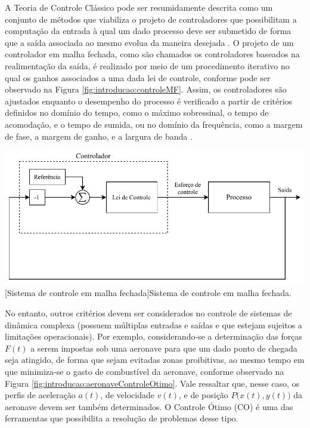 
A Teoria de Controle Clássico pode ser resumidamente descrita como um conjunto de métodos que viabiliza o projeto de controladores que possibilitam a computação da entrada à qual um dado processo deve ser submetido de forma que a saída associada ao mesmo evolua da maneira desejada \cite{franklin_sistemas_2013}. O projeto de um controlador em malha fechada, como são chamados os controladores baseados na realimentação da saída, é realizado por meio de um procedimento iterativo no qual os ganhos associados a uma dada lei de controle, conforme pode ser observado na Figura \ref{fig:introducao:controleMF}. Assim, os controladores são ajustados enquanto o desempenho do processo é verificado a partir de critérios definidos no domínio do tempo, como o máximo sobressinal, o tempo de acomodação, e o tempo de sumida, ou no domínio da frequência, como a margem de fase, a margem de ganho, e a largura de banda \cite{kirk_optimal_2004}. 

\noindent	
\begin{minipage}{\textwidth}
	\vspace{\onelineskip}
	\centering
	\includegraphics[width=1\linewidth]{diag/introducao/pdf/controleMF}
	[Sistema de controle em malha fechada]{Sistema de controle em malha fechada.}
	\label{fig:introducao:controleMF}
	\vspace{\onelineskip}
\end{minipage}

No entanto, outros critérios devem ser considerados no controle de sistemas de dinâmica complexa (possuem múltiplas entradas e saídas e que estejam sujeitos a limitações operacionais). Por exemplo, considerando-se a determinação das forças $ F(t) $ a serem impostas sob uma aeronave para que um dado ponto de chegada seja atingido, de forma que sejam evitadas zonas proibitivas, ao mesmo tempo em que minimiza-se o gasto de combustível da aeronave, conforme observado na Figura \ref{fig:introducao:aeronaveControleOtimo}. Vale ressaltar que, nesse caso, os perfis de aceleração $ a(t) $, de velocidade $ v(t) $, e de posição $ P\big(x(t), y(t)\big) $ da aeronave devem ser também determinados. O Controle Ótimo (CO) é uma das ferramentas que possibilita a resolução de problemas desse tipo. 

